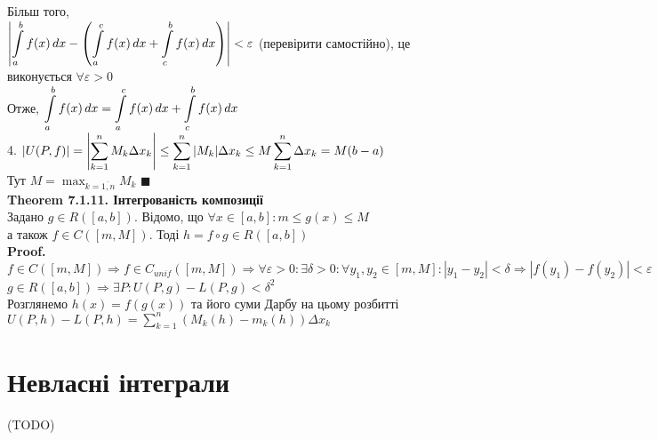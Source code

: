 \documentclass[a4paper, 14pt]{extarticle}
\def\huge{\displaystyle}
\def\bigline{\vspace{5mm}\\}
\def\th#1{\textbf{Theorem {#1}}}
\def\proof{\textbf{Proof.}\\}
\def\bigline{\vspace{5mm}\\}
\def\qed{$\blacksquare$}
\begin{document}
Більш того, \\
$\displaystyle \abs{\int\displaylimits_a^b f(x)\,dx - \left(\int\displaylimits_a^c f(x)\,dx + \int\displaylimits_c^b f(x)\,dx \right)} < \varepsilon$ (перевірити самостійно), це виконується $\forall \varepsilon > 0$\\
Отже, $\huge \int\displaylimits_a^b f(x)\,dx = \int\displaylimits_a^c f(x)\,dx + \int\displaylimits_c^b f(x)\,dx$
\bigline
4. $|U(P,f)| =\huge \abs{ \sum_{k=1}^n M_k \Delta x_k} \leq \sum_{k=1}^n |M_k| \Delta x_k \leq M \sum_{k=1}^n \Delta x_k = M (b-a)$\\
Тут $M = \huge \max_{k = \overline{1,n}} M_k$ \qed
\bigline
\th{7.1.11. Інтегрованість композиції}\\
Задано $g \in R([a,b])$. Відомо, що $\forall x \in [a,b]: m \leq g(x) \leq M$\\
а також $f \in C([m,M])$. Тоді $h = f \circ g \in R([a,b])$\\
\proof
$f \in C([m,M]) \Rightarrow f \in C_{unif}([m,M]) \Rightarrow \forall \varepsilon > 0: \exists \delta > 0: \forall y_1,y_2 \in [m,M]: |y_1-y_2| < \delta \Rightarrow |f(y_1)-f(y_2)| < \varepsilon$\\
$g \in R([a,b]) \Rightarrow \exists P: U(P,g) - L(P,g) < \delta^2$\\
Розглянемо $h(x) = f(g(x))$ та його суми Дарбу на цьому розбитті\\
$U(P,h) - L(P,h) = \huge \sum_{k=1}^n (M_k(h) - m_k(h)) \Delta x_k$
\newpage
\section{Невласні інтеграли}
(TODO)
\newpage
\end{document}
